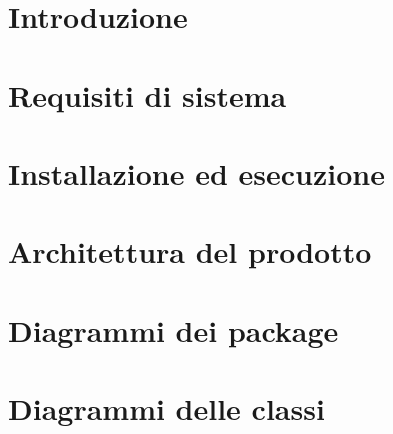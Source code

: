 \documentclass[a4paper, oneside, openany, dvipsnames, table]{article}
\begin{document}
\copertina{} 

\newpage
\tableofcontents
\newpage
\listoffigures
\newpage
\listoftables
\newpage

\section{Introduzione}

\newpage
\section{Requisiti di sistema}

\newpage
\section{Installazione ed esecuzione}

\newpage
\section{Architettura del prodotto}

\newpage
\section{Diagrammi dei package}

\newpage
\section{Diagrammi delle classi}

\newpage
\end{document}
